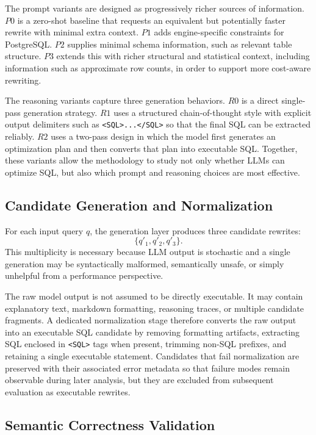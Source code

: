 The prompt variants are designed as progressively richer sources of information. $P0$ is a zero-shot baseline that requests an equivalent but potentially faster rewrite with minimal extra context. $P1$ adds engine-specific constraints for PostgreSQL. $P2$ supplies minimal schema information, such as relevant table structure. $P3$ extends this with richer structural and statistical context, including information such as approximate row counts, in order to support more cost-aware rewriting.

The reasoning variants capture three generation behaviors. $R0$ is a direct single-pass generation strategy. $R1$ uses a structured chain-of-thought style with explicit output delimiters such as \texttt{<SQL>...</SQL>} so that the final SQL can be extracted reliably. $R2$ uses a two-pass design in which the model first generates an optimization plan and then converts that plan into executable SQL. Together, these variants allow the methodology to study not only whether LLMs can optimize SQL, but also which prompt and reasoning choices are most effective.

\subsection{Candidate Generation and Normalization}

For each input query $q$, the generation layer produces three candidate rewrites:
\[
\{q'_1, q'_2, q'_3\}.
\]
This multiplicity is necessary because LLM output is stochastic and a single generation may be syntactically malformed, semantically unsafe, or simply unhelpful from a performance perspective.

The raw model output is not assumed to be directly executable. It may contain explanatory text, markdown formatting, reasoning traces, or multiple candidate fragments. A dedicated normalization stage therefore converts the raw output into an executable SQL candidate by removing formatting artifacts, extracting SQL enclosed in \texttt{<SQL>} tags when present, trimming non-SQL prefixes, and retaining a single executable statement. Candidates that fail normalization are preserved with their associated error metadata so that failure modes remain observable during later analysis, but they are excluded from subsequent evaluation as executable rewrites.

\subsection{Semantic Correctness Validation}

